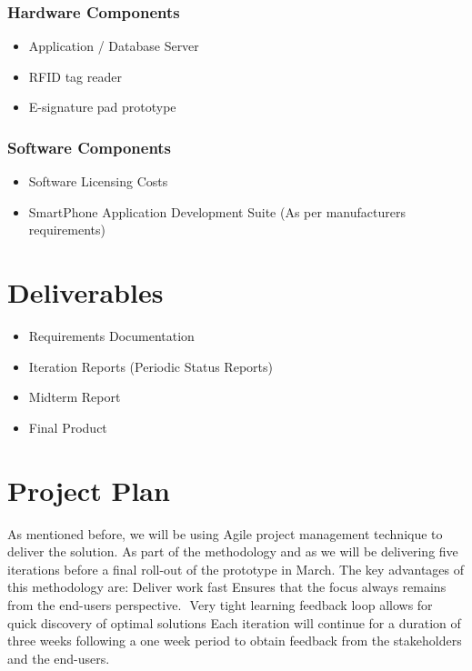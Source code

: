 \documentclass{journal}
\begin{document}
\subsubsection{ Hardware Components }
\begin{itemize}
\item{Application / Database Server}
\item{RFID tag reader}
\item{E-signature pad prototype}
\end{itemize}

\subsubsection{ Software Components }
\begin{itemize}
\item{Software Licensing Costs }
\item{SmartPhone Application Development Suite (As per manufacturers requirements)}
\end{itemize}

\section{Deliverables}
\begin{itemize}
 \item{ Requirements Documentation }
 \item{ Iteration Reports (Periodic Status Reports) }
 \item{ Midterm Report}
 \item{ Final Product }
\end{itemize}
\section{Project Plan}
As mentioned before, we will be using Agile project management technique to deliver the solution. As part of the methodology and as we will be delivering five iterations before a final roll-out of the prototype in March. The key advantages of this methodology are:
Deliver work fast
Ensures that the focus always remains from the end-users perspective. 
Very tight learning feedback loop allows for quick discovery of optimal solutions
Each iteration will continue for a duration of three weeks following a one week period to obtain feedback from the stakeholders and the end-users.
\newpage
\thispagestyle{empty}
\end{document}

